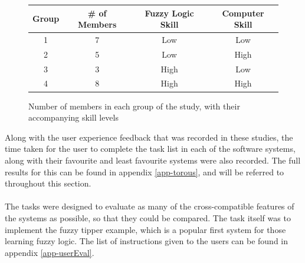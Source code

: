 \begin{figure}[ht!]
\begin{center}
\begin{tabular}{cccc}
\hline
\textbf{Group} 	& \textbf{\# of Members} & \textbf{Fuzzy Logic Skill} & \textbf{Computer Skill} \\
\hline
1				& 7 						 & Low			& Low		\\	
2				& 5  						 & Low			& High		\\
3				& 3 						 & High			& Low 		\\
4				& 8 						 & High 		& High		\\
\hline
\end{tabular}
\end{center}
\captionsetup{justification=centering,margin=2cm}
\vspace{-4mm}
\caption{Number of members in each group of the study, with their accompanying skill levels}
\label{fig:skill-table}
\vspace{-2mm}
\end{figure}
\noindent 
Along with the user experience feedback that was recorded in these studies, the time taken for the user to complete the task list in each of the software systems, along with their favourite and least favourite systems were also recorded. The full results for this can be found in appendix \ref{app-torous}, and will be referred to throughout this section.\ \\
\ \\
The tasks were designed to evaluate as many of the cross-compatible features of the systems as possible, so that they could be compared. The task itself was to implement the fuzzy tipper example, which is a popular first system for those learning fuzzy logic. The list of instructions given to the users can be found in appendix \ref{app-userEval}.

